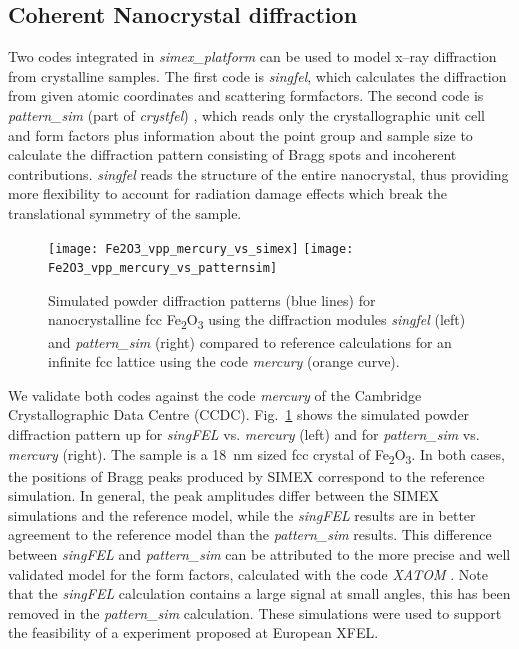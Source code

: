 \documentclass[10pt]{scrartcl}
\begin{document}
\subsection{Coherent Nanocrystal diffraction\label{sec:coherent_nanocrystal_diffraction}}
Two codes integrated in \textit{simex\_platform} can be used to model x--ray
diffraction from crystalline samples. The first code is \textit{singfel},
which calculates the diffraction from given atomic coordinates and scattering
formfactors. The second code is \textit{pattern\_sim} (part of
\textit{crystfel}) \cite{White2012}, which
reads only the crystallographic unit cell and form factors plus information
about the point group and sample size to calculate the diffraction
pattern consisting of Bragg spots and incoherent contributions.
\textit{singfel} reads the structure of the entire nanocrystal, thus providing
more flexibility to account for radiation damage effects which break the
translational symmetry of the sample.
%
\begin{figure}[ht]
  \begin{center}
      \texttt{[image: Fe2O3\_vpp\_mercury\_vs\_simex]}
      \texttt{[image: Fe2O3\_vpp\_mercury\_vs\_patternsim]}
  \caption{Simulated powder diffraction patterns (blue lines) for nanocrystalline fcc Fe\textsubscript{2}O\textsubscript{3}
  using the diffraction modules \textit{singfel} (left) and \textit{pattern\_sim}
  (right) compared to reference calculations for an infinite fcc lattice
    using the code \textit{mercury} (orange curve).}
    \label{fig:Fe2O3_vpp_model_vs_model}
  \end{center}
\end{figure}
%
We validate both codes against the code \textit{mercury} \cite{Macrae2008} of the
Cambridge Crystallographic Data Centre (CCDC). Fig.~\ref{fig:Fe2O3_vpp_model_vs_model} shows the simulated
powder diffraction pattern up for \textit{singFEL} vs. \textit{mercury} (left)
and for \textit{pattern\_sim} vs. \textit{mercury} (right). The sample is a
\SI{18}{\nano\metre} sized fcc crystal of
Fe\textsubscript{2}O\textsubscript{3}. In both cases, the
positions of Bragg peaks produced by SIMEX correspond to the reference
simulation. In general, the peak amplitudes differ between the SIMEX simulations and the
reference model, while the \textit{singFEL} results are in better agreement to the
reference model than the \textit{pattern\_sim} results. This difference between
\textit{singFEL} and \textit{pattern\_sim} can be attributed to the more
precise and well validated model for the form factors, calculated with the code \textit{XATOM}
\cite{Son2011}. Note that the \textit{singFEL} calculation contains a
large signal at small angles, this has been removed in the \textit{pattern\_sim}
calculation. These simulations were used to support the feasibility of a
experiment proposed at European XFEL.
\end{document}
